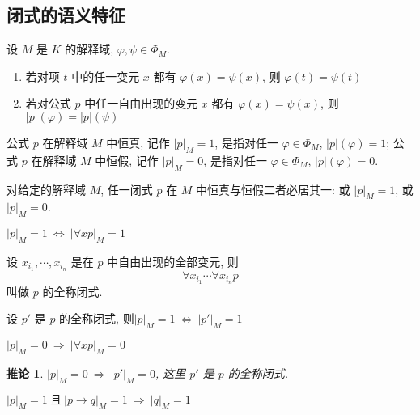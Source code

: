 \documentclass[
    color=black,
    device=normal,
    lang=cn
]{elegantnote}
\newtheorem{deduction}{推论}[section]
\begin{document}
\subsection{闭式的语义特征}
\begin{proposition}
    设 $M$ 是 $K$ 的解释域, $\varphi, \psi\in\Phi_M$.
    \begin{enumerate}[label = $\arabic*^\circ$]
        \item 若对项 $t$ 中的任一变元 $x$ 都有 $\varphi(x)=\psi(x)$, 则 $\varphi(t)=\psi(t)$
        \item 若对公式 $p$ 中任一自由出现的变元 $x$ 都有 $\varphi(x)=\psi(x)$, 则 $\lvert p\rvert (\varphi)=\lvert p\rvert (\psi)$
    \end{enumerate}
\end{proposition}
\begin{definition}[公式在解释域中恒真与恒假]
    公式 $p$ 在解释域 $M$ 中恒真, 记作 $\lvert p\rvert_M=1$, 是指对任一 $\varphi\in\Phi_M$, $\lvert p\rvert (\varphi)=1$;
    公式 $p$ 在解释域 $M$ 中恒假, 记作 $\lvert p\rvert_M=0$, 是指对任一 $\varphi\in\Phi_M$, $\lvert p\rvert (\varphi)=0$.
\end{definition}
\begin{theorem}
    对给定的解释域 $M$, 任一闭式 $p$ 在 $M$ 中恒真与恒假二者必居其一: 或 $\lvert p\rvert_M=1$, 或 $\lvert p\rvert_M=0$.
\end{theorem}
\begin{proposition}
    $\lvert p\rvert_M=1\ \Leftrightarrow\  \lvert\forall xp\rvert_M=1$
\end{proposition}
\begin{definition}[全称闭式]
    设 $x_{i_1}, \cdots, x_{i_n}$ 是在 $p$ 中自由出现的全部变元, 则
    $$
        \forall x_{i_1}\cdots\forall x_{i_n} p
    $$
    叫做 $p$ 的全称闭式.
\end{definition}
\begin{proposition}
    设 $p'$ 是 $p$ 的全称闭式, 则$\lvert p\rvert_M=1\ \Leftrightarrow\ \lvert p'\rvert_M = 1$
\end{proposition}
\begin{proposition}
    $\lvert p\rvert_M = 0\ \Rightarrow\  \lvert\forall xp\rvert_M=0$
\end{proposition}
\begin{deduction}
    $\lvert p\rvert_M = 0\ \Rightarrow\  \lvert p'\rvert_M=0$, 这里 $p'$ 是 $p$ 的全称闭式.
\end{deduction}
\begin{proposition}
    $\lvert p\rvert_M=1\ \text{且}\ \lvert p\to q\rvert_M = 1\ \Rightarrow\  \lvert q\rvert_M=1$
\end{proposition}
\end{document}

